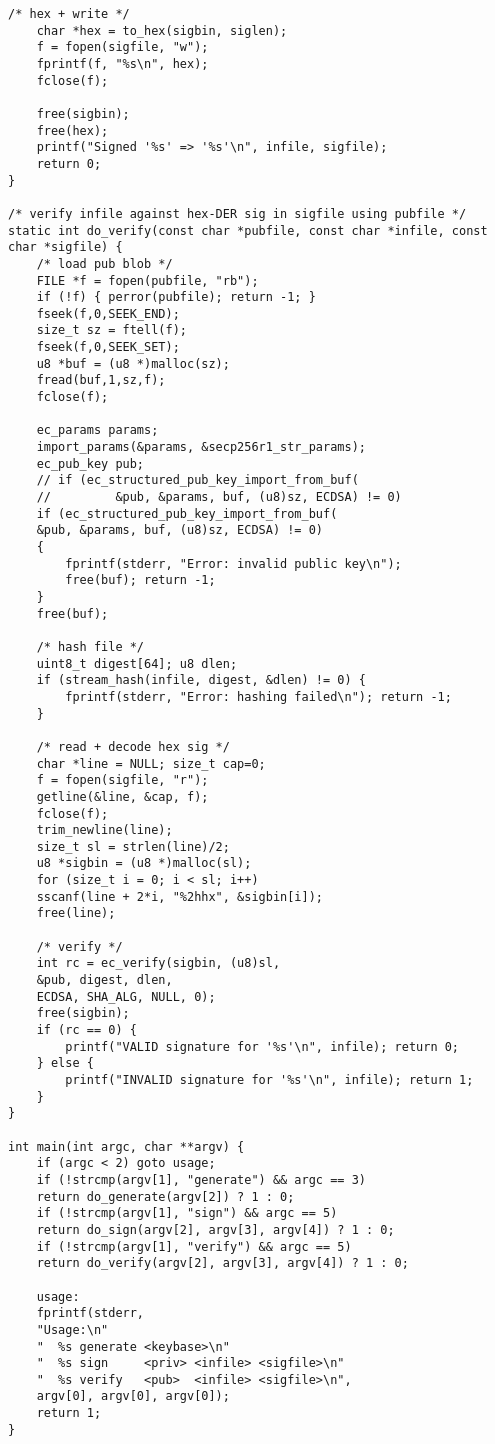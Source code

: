 \begin{lstlisting}[style=cstyle]
	/* hex + write */
	char *hex = to_hex(sigbin, siglen);
	f = fopen(sigfile, "w");
	fprintf(f, "%s\n", hex);
	fclose(f);
	
	free(sigbin);
	free(hex);
	printf("Signed '%s' => '%s'\n", infile, sigfile);
	return 0;
}

/* verify infile against hex-DER sig in sigfile using pubfile */
static int do_verify(const char *pubfile, const char *infile, const char *sigfile) {
	/* load pub blob */
	FILE *f = fopen(pubfile, "rb");
	if (!f) { perror(pubfile); return -1; }
	fseek(f,0,SEEK_END);
	size_t sz = ftell(f);
	fseek(f,0,SEEK_SET);
	u8 *buf = (u8 *)malloc(sz);
	fread(buf,1,sz,f);
	fclose(f);
	
	ec_params params;
	import_params(&params, &secp256r1_str_params);
	ec_pub_key pub;
	// if (ec_structured_pub_key_import_from_buf(
	//         &pub, &params, buf, (u8)sz, ECDSA) != 0)
	if (ec_structured_pub_key_import_from_buf(
	&pub, &params, buf, (u8)sz, ECDSA) != 0)
	{
		fprintf(stderr, "Error: invalid public key\n");
		free(buf); return -1;
	}
	free(buf);
	
	/* hash file */
	uint8_t digest[64]; u8 dlen;
	if (stream_hash(infile, digest, &dlen) != 0) {
		fprintf(stderr, "Error: hashing failed\n"); return -1;
	}
	
	/* read + decode hex sig */
	char *line = NULL; size_t cap=0;
	f = fopen(sigfile, "r");
	getline(&line, &cap, f);
	fclose(f);
	trim_newline(line);
	size_t sl = strlen(line)/2;
	u8 *sigbin = (u8 *)malloc(sl);
	for (size_t i = 0; i < sl; i++)
	sscanf(line + 2*i, "%2hhx", &sigbin[i]);
	free(line);
	
	/* verify */
	int rc = ec_verify(sigbin, (u8)sl,
	&pub, digest, dlen,
	ECDSA, SHA_ALG, NULL, 0);
	free(sigbin);
	if (rc == 0) {
		printf("VALID signature for '%s'\n", infile); return 0;
	} else {
		printf("INVALID signature for '%s'\n", infile); return 1;
	}
}

int main(int argc, char **argv) {
	if (argc < 2) goto usage;
	if (!strcmp(argv[1], "generate") && argc == 3)
	return do_generate(argv[2]) ? 1 : 0;
	if (!strcmp(argv[1], "sign") && argc == 5)
	return do_sign(argv[2], argv[3], argv[4]) ? 1 : 0;
	if (!strcmp(argv[1], "verify") && argc == 5)
	return do_verify(argv[2], argv[3], argv[4]) ? 1 : 0;
	
	usage:
	fprintf(stderr,
	"Usage:\n"
	"  %s generate <keybase>\n"
	"  %s sign     <priv> <infile> <sigfile>\n"
	"  %s verify   <pub>  <infile> <sigfile>\n",
	argv[0], argv[0], argv[0]);
	return 1;
}
\end{lstlisting}

